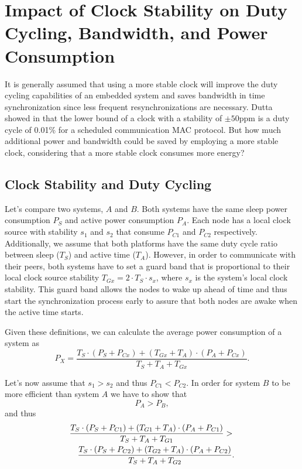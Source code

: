 \section{Impact of Clock Stability on Duty Cycling, Bandwidth, and Power Consumption}

It is generally assumed that using a more stable clock will improve the duty
cycling capabilities of an embedded system and saves bandwidth in time
synchronization since less frequent resynchronizations are necessary. Dutta
showed in \cite{dutta2007procrastination} that the lower bound of a clock with
a stability of $\pm 50$ppm is a duty cycle of 0.01\% for a scheduled
communication MAC protocol. But how much additional power and bandwidth could be saved by
employing a more stable clock, considering that a more stable clock consumes
more energy? 

\subsection{Clock Stability and Duty Cycling}
Let's compare two systems, $A$ and $B$. Both systems have the same sleep power
consumption $P_S$ and active power consumption $P_A$.  Each node has a local
clock source with stability $s_1$ and $s_2$ that consume $P_{C1}$ and $P_{C2}$
respectively. Additionally, we assume that both platforms have the same duty
cycle ratio between sleep ($T_S$) and active time ($T_A$). However, in order
to communicate with their peers, both systems have to set a guard band that is
proportional to their local clock source stability $T_{Gx} = 2 \cdot T_S \cdot
s_x$, where $s_x$ is the system's local clock stability. This guard band
allows the nodes to wake up ahead of time and thus start the synchronization
process early to assure that both nodes are awake when the active time starts.

Given these definitions, we can calculate the average power consumption of a
system as
\begin{equation}
	P_X = \frac{T_S \cdot (P_S + P_{Cx}) + (T_{Gx} + T_A) \cdot (P_A + P_{Cx})}{T_S + T_A + T_{Gx}}.
\end{equation}

Let's now assume that $s_1 > s_2$ and thus $P_{C1} < P_{C2}$. In order for
system $B$ to be more efficient than system $A$ we have to show that
\begin{equation}
	P_A > P_B,
\end{equation}
and thus
\begin{eqnarray}
	\lefteqn{\frac{T_S \cdot (P_S + P_{C1}) + (T_{G1} + T_A) \cdot (P_A + P_{C1})}{T_S + T_A + T_{G1}}  > } \nonumber \\
	& & \frac{T_S \cdot (P_S + P_{C2}) + (T_{G2} + T_A) \cdot (P_A +
	P_{C2})}{T_S + T_A + T_{G2}}.\label{eq:1}
\end{eqnarray}

